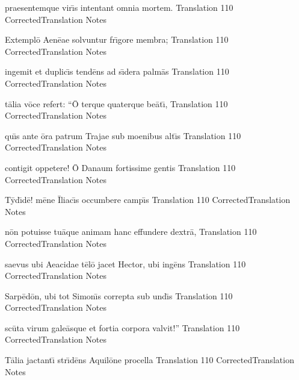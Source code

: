 \documentclass[]{book}
\begin{document}
	\latline
	  {praesentemque vir\={\macron \i}s intentant omnia mortem.}
	  { Translation }
	  {110}
	  { CorrectedTranslation }
	  { Notes }


	\newpage

	\latline
	  {Extempl\={\macron o} Aen\={\macron e}ae solvuntur fr\={\macron \i}gore membra;}
	  { Translation }
	  {110}
	  { CorrectedTranslation }
	  { Notes }


	\latline
	  {ingemit et duplic\={\macron \i}s tend\={\macron e}ns ad s\={\macron \i}dera palm\={\macron a}s}
	  { Translation }
	  {110}
	  { CorrectedTranslation }
	  { Notes }


	\latline
	  {t\={\macron a}lia v\={\macron o}ce refert:  ``\={\macron O} terque quaterque be\={\macron a}t\={\macron \i},}
	  { Translation }
	  {110}
	  { CorrectedTranslation }
	  { Notes }


	\newpage

	\latline
	  {qu\={\macron \i}s ante \={\macron o}ra patrum Trajae sub moenibus alt\={\macron \i}s}
	  { Translation }
	  {110}
	  { CorrectedTranslation }
	  { Notes }


	\latline
	  {contigit oppetere!  \={\macron O} Danaum fortissime gentis}
	  { Translation }
	  {110}
	  { CorrectedTranslation }
	  { Notes }


	\latline
	  {T\={\macron y}d\={\macron \i}d\={\macron e}!  m\={\macron e}ne \={\macron I}liac\={\macron \i}s occumbere camp\={\macron \i}s}
	  { Translation }
	  {110}
	  { CorrectedTranslation }
	  { Notes }


	\newpage

	\latline
	  {n\={\macron o}n potuisse tu\={\macron a}que animam hanc effundere dextr\={\macron a},}
	  { Translation }
	  {110}
	  { CorrectedTranslation }
	  { Notes }


	\latline
	  {saevus ubi Aeacidae t\={\macron e}l\={\macron o} jacet Hector, ubi ing\={\macron e}ns}
	  { Translation }
	  {110}
	  { CorrectedTranslation }
	  { Notes }


	\latline
	  {Sarp\={\macron e}d\={\macron o}n, ubi tot Simon\={\macron \i}s correpta sub und\={\macron \i}s}
	  { Translation }
	  {110}
	  { CorrectedTranslation }
	  { Notes }


	\newpage

	\latline
	  {sc\={\macron u}ta virum gale\={\macron a}sque et fortia corpora valvit!''}
	  { Translation }
	  {110}
	  { CorrectedTranslation }
	  { Notes }


	\latline
	  {T\={\macron a}lia jactant\={\macron \i} str\={\macron \i}d\={\macron e}ns Aquil\={\macron o}ne procella}
	  { Translation }
	  {110}
	  { CorrectedTranslation }
	  { Notes }
\end{document}
